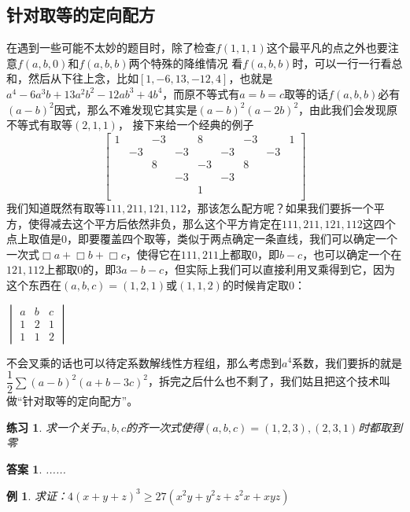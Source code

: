 \documentclass[UTF8]{ctexart}
\newtheorem{1}{例}
\newtheorem{3}{练习}
\newtheorem{4}{答案}
\begin{document}
\subsection{针对取等的定向配方}
在遇到一些可能不太妙的题目时，除了检查$ f(1,1,1) $这个最平凡的点之外也要注意$ f(a,b,0) $和$ f(a,b,b) $两个特殊的降维情况
看$ f(a,b,b) $时，可以一行一行看总和，然后从下往上念，比如$ [1, -6, 13, -12, 4] $，也就是$ a^{4}-6a^{3}b+13a^{2}b^{2}-12ab^{3}+4b^{4} $，而原不等式有$ a=b=c $取等的话$ f(a,b,b) $必有$ (a-b)^{2} $因式，那么不难发现它其实是$ (a-b)^{2}(a-2b)^{2} $，由此我们会发现原不等式有取等$ (2,1,1) $，
接下来给一个经典的例子
\renewcommand*{\arraystretch}{1.732}\[
\left[\begin{matrix}
	1& &-3& &8& &-3& &1\\
	&-3& &-3& &-3& &-3&\\
	& &8& &-3& &8& &\\
	& & &-3& &-3& & &\\
	& & & &1& & & &\\
\end{matrix}\right]
\]
我们知道既然有取等$ 111,211,121,112 $，那该怎么配方呢？如果我们要拆一个平方，使得减去这个平方后依然非负，那么这个平方肯定在$ 111,211,121,112 $这四个点上取值是$ 0 $，即要覆盖四个取等，类似于两点确定一条直线，我们可以确定一个一次式$ \Box a+\Box b+\Box c $，使得它在$ 111,211 $上都取$ 0 $，即$ b-c $，也可以确定一个在$ 121,112 $上都取$ 0 $的，即$ 3a-b-c $，但实际上我们可以直接利用叉乘得到它，因为这个东西在$ (a,b,c)=(1,2,1) $或$ (1,1,2) $的时候肯定取$ 0 $：
\begin{center}
	$ \begin{vmatrix}
		a& b & c\\
		1& 2 & 1\\
		1& 1 & 2
	\end{vmatrix} $
\end{center}
不会叉乘的话也可以待定系数解线性方程组，那么考虑到$ a^{4} $系数，我们要拆的就是$\dfrac{1}{2} \displaystyle \sum (a-b)^{2}(a+b-3c)^{2} $，拆完之后什么也不剩了，我们姑且把这个技术叫做“针对取等的定向配方”。\\
\begin{3}
	求一个关于$ a,b,c $的齐一次式使得$ (a,b,c)=(1,2,3),(2,3,1) $时都取到零
\end{3}
\begin{4}
	......
\end{4}
\begin{1}
	求证：$ 4(x+y+z)^{3}\ge 27(x^{2}y+y^{2}z+z^{2}x+xyz) $
\end{1}
\end{document}

